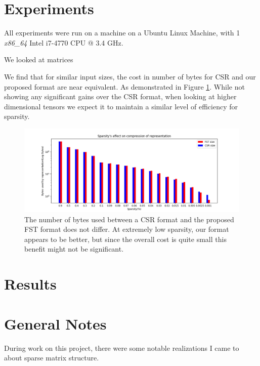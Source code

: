 \documentclass[12pt]{article}
\begin{document}

\section*{Experiments}

All experiments were run on a machine on a Ubuntu Linux Machine, with 1 \textit{x86\_64} Intel
i7-4770 CPU @ 3.4 GHz.

We looked at matrices

We find that for similar input sizes, the cost in number of bytes for CSR and our proposed
format are near equivalent. As demonstrated in Figure \ref{fig:sparsity}. While not showing any
significant gains over the CSR format, when looking at higher dimensional tensors we expect it
to maintain a similar level of efficiency for sparsity.

\begin{center}
\begin{figure}
  \includegraphics[width=\textwidth]{sparsity}
  \caption{The number of bytes used between a CSR format and the proposed FST format does not
differ. At extremely low sparsity, our format appears to be better, but since the overall
cost is quite small this benefit might not be significant.}
  \label{fig:sparsity}
\end{figure}
\end{center}



\section*{Results}

\appendix
\section{General Notes}
During work on this project, there were some notable realizations I came to about sparse matrix
structure.
\end{document}
